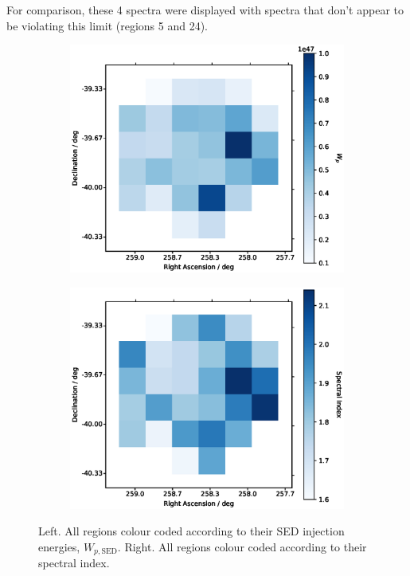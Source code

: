 \documentclass[12pt,a4paper]{article}
\begin{document}
For comparison, these 4 spectra were displayed with spectra that don't appear to be violating this limit (regions 5 and 24). 
\begin{figure}[H]
	\begin{subfigure}{0.5\textwidth}
		\centering
		\includegraphics[width=1\linewidth, height=0.27\textheight]{Wpmap}
	\end{subfigure}
	\begin{subfigure}{0.5\textwidth}
		\centering
		\includegraphics[width=1\linewidth, height=0.27\textheight]{alphamap}
	\end{subfigure}
	\caption{Left. All regions colour coded according to their SED injection energies, $W_{p,\mathrm{SED}}$. Right. All regions colour coded according to their spectral index.}
	\label{fig:paramsmaps}
\end{figure}
\end{document}
